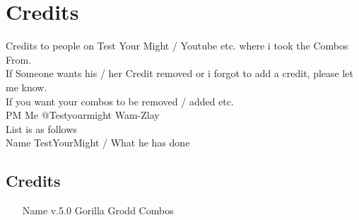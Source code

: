 \documentclass[main.tex]{subfiles}
\begin{document}
\chapter{Credits}

Credits to people on Test Your Might / Youtube etc. where i took the Combos From.\\

If Someone wants his / her Credit removed or i forgot to add a credit, please let me know.\\
If you want your combos to be removed / added etc.\\
PM Me @Testyourmight Wam-Zlay\\

List is as follows\\

Name TestYourMight / What he has done\\

\section{Credits}

\begin{itemize}
\item [Name v.5.0] Gorilla Grodd Combos 
\end{itemize}
\end{document}
